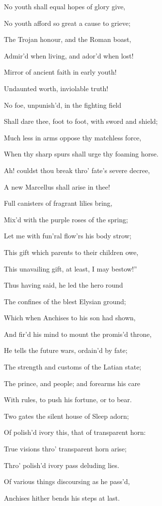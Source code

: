 No youth shall equal hopes of glory give,

No youth afford so great a cause to grieve;

The Trojan honour, and the Roman boast,

Admir’d when living, and ador’d when lost!

Mirror of ancient faith in early youth!

Undaunted worth, inviolable truth!

No foe, unpunish’d, in the fighting field

Shall dare thee, foot to foot, with sword and shield;

Much less in arms oppose thy matchless force,

When thy sharp spurs shall urge thy foaming horse.

Ah! couldst thou break thro’ fate’s severe decree,

A new Marcellus shall arise in thee!

Full canisters of fragrant lilies bring,

Mix’d with the purple roses of the spring;

Let me with fun’ral flow’rs his body strow;

This gift which parents to their children owe,

This unavailing gift, at least, I may bestow!”

Thus having said, he led the hero round

The confines of the blest Elysian ground;

Which when Anchises to his son had shown,

And fir’d his mind to mount the promis’d throne,

He tells the future wars, ordain’d by fate;

The strength and customs of the Latian state;

The prince, and people; and forearms his care

With rules, to push his fortune, or to bear.

Two gates the silent house of Sleep adorn;

Of polish’d ivory this, that of transparent horn:

True visions thro’ transparent horn arise;

Thro’ polish’d ivory pass deluding lies.

Of various things discoursing as he pass’d,

Anchises hither bends his steps at last.

